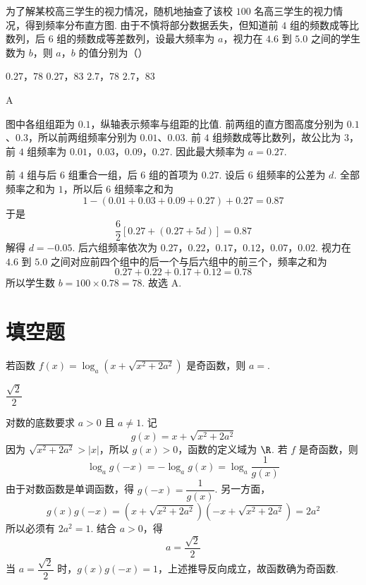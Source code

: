 \begin{problem}
为了解某校高三学生的视力情况，随机地抽查了该校 \(100\) 名高三学生的视力情况，得到频率分布直方图. 由于不慎将部分数据丢失，但知道前 \(4\) 组的频数成等比数列，后 \(6\) 组的频数成等差数列，设最大频率为 \(a\)，视力在 \(4.6\) 到 \(5.0\) 之间的学生数为 \(b\)，则 \(a\)，\(b\) 的值分别为（\quad）


\choices
    {\(0.27\)，\(78\)}
    {\(0.27\)，\(83\)}
    {\(2.7\)，\(78\)}
    {\(2.7\)，\(83\)}
\end{problem}

\begin{answer}
A
\end{answer}

\begin{solution}
图中各组组距为 \(0.1\)，纵轴表示频率与组距的比值. 前两组的直方图高度分别为 \(0.1\)、\(0.3\)，所以前两组频率分别为 \(0.01\)、\(0.03\). 前 \(4\) 组频数成等比数列，故公比为 \(3\)，前 \(4\) 组频率为
\(0.01\)，\(0.03\)，\(0.09\)，\(0.27\).
因此最大频率为 \(a=0.27\).

前 \(4\) 组与后 \(6\) 组重合一组，后 \(6\) 组的首项为 \(0.27\). 设后 \(6\) 组频率的公差为 \(d\). 全部频率之和为 \(1\)，所以后 \(6\) 组频率之和为
\[
1-(0.01+0.03+0.09+0.27)+0.27=0.87
\]
于是
\[
\frac{6}{2}\left[0.27+(0.27+5d)\right]=0.87
\]
解得 \(d=-0.05\). 后六组频率依次为 \(0.27\)，\(0.22\)，\(0.17\)，\(0.12\)，\(0.07\)，\(0.02\). 视力在 \(4.6\) 到 \(5.0\) 之间对应前四个组中的后一个与后六组中的前三个，频率之和为
\[
0.27+0.22+0.17+0.12=0.78
\]
所以学生数 \(b=100\times0.78=78\). 故选 A.
\end{solution}

\section{填空题}
\begin{problem}
若函数 \(f(x)=\log_a\left(x+\sqrt{x^2+2a^2}\right)\) 是奇函数，则 \(a=\)\fillinblank{}.
\end{problem}

\begin{answer}
\(\dfrac{\sqrt2}{2}\)
\end{answer}

\begin{solution}
对数的底数要求 \(a>0\) 且 \(a\neq1\). 记
\[
g(x)=x+\sqrt{x^2+2a^2}
\]
因为 \(\sqrt{x^2+2a^2}>|x|\)，所以 \(g(x)>0\)，函数的定义域为 \(\R\). 若 \(f\) 是奇函数，则
\[
\log_a g(-x)=-\log_a g(x)=\log_a\frac1{g(x)}
\]
由于对数函数是单调函数，得 \(g(-x)=\dfrac1{g(x)}\). 另一方面，
\[
g(x)g(-x)=\left(x+\sqrt{x^2+2a^2}\right)\left(-x+\sqrt{x^2+2a^2}\right)=2a^2
\]
所以必须有 \(2a^2=1\). 结合 \(a>0\)，得
\[
a=\frac{\sqrt2}{2}
\]
当 \(a=\dfrac{\sqrt2}{2}\) 时，\(g(x)g(-x)=1\)，上述推导反向成立，故函数确为奇函数.
\end{solution}

